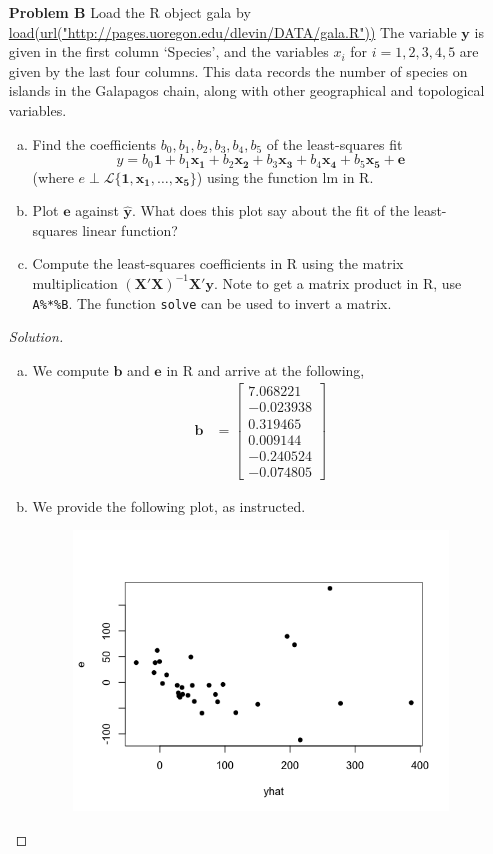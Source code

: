 \documentclass{amsart}
\begin{document}
\begin{enumerate}
		\item[\textbf{Problem B}] Load the R object gala by \url{load(url("http://pages.uoregon.edu/dlevin/DATA/gala.R"))}
		The variable $\mathbf{y}$ is given in the first column `Species', and the variables $x_{i}$ for $i = 1, 2, 3, 4, 5$ are given by the last four columns. 
		This data records the number of species on islands in the Galapagos chain, along with other geographical and topological variables.
		\begin{enumerate}[(a)]
			\item Find the coefficients $b_{0},b_{1},b_{2},b_{3},b_{4},b_{5}$ of the least-squares fit $$y =b_{0}\mathbf{1}+b_{1}\mathbf{x_{1}} +b_{2}\mathbf{x_{2}} +b_{3}\mathbf{x_{3}} +b_{4}\mathbf{x_{4}} +b_{5}\mathbf{x_{5}} + \mathbf{e}$$ (where $e \perp \mathscr{L}\{\mathbf{1},\mathbf{x_{1}},\dots,\mathbf{x_{5}}\}$) using the function lm in R.
			\item Plot $\mathbf{e}$ against $\mathbf{\hat{y}}$. 
			What does this plot say about the fit of the least-squares linear function?
			\item Compute the least-squares coefficients in R using the matrix multiplication $(\mathbf{X}'\mathbf{X})^{-1}\mathbf{X}'\mathbf{y}$.
			 Note to get a matrix product in R, use \texttt{A\%*\%B}. 
			 The function \texttt{solve} can be used to invert a matrix.
		\end{enumerate}
		\begin{proof}[Solution] \
			\begin{enumerate}[(a)]
				\item We compute $\mathbf{b}$ and $\mathbf{e}$ in R and arrive at the following,
					\begin{align*}
						\mathbf{b} &= \begin{bmatrix}
										7.068221 \\ 
										-0.023938 \\ 
										0.319465 \\ 
										0.009144 \\ 
										-0.240524 \\ 
										-0.074805
									\end{bmatrix}
					\end{align*}
				\item We provide the following plot, as instructed.
					\begin{figure}[h]
						\includegraphics[width=0.6\linewidth]{plot3.png}

\end{figure}
\end{enumerate}
\end{proof}
\end{enumerate}
\end{document}
